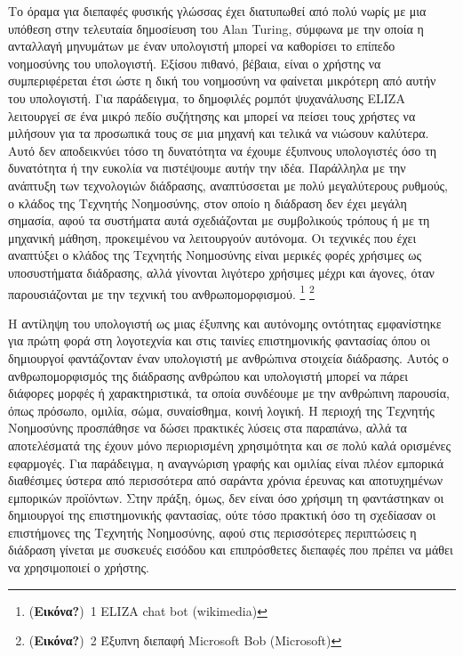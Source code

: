 \documentclass[
]{article}
\begin{document}
Το όραμα για διεπαφές φυσικής γλώσσας έχει διατυπωθεί από πολύ νωρίς με
μια υπόθεση στην τελευταία δημοσίευση του Alan Turing, σύμφωνα με την
οποία η ανταλλαγή μηνυμάτων με έναν υπολογιστή μπορεί να καθορίσει το
επίπεδο νοημοσύνης του υπολογιστή. Εξίσου πιθανό, βέβαια, είναι ο
χρήστης να συμπεριφέρεται έτσι ώστε η δική του νοημοσύνη να φαίνεται
μικρότερη από αυτήν του υπολογιστή. Για παράδειγμα, το δημοφιλές ρομπότ
ψυχανάλυσης ELIZA λειτουργεί σε ένα μικρό πεδίο συζήτησης και μπορεί να
πείσει τους χρήστες να μιλήσουν για τα προσωπικά τους σε μια μηχανή και
τελικά να νιώσουν καλύτερα. Αυτό δεν αποδεικνύει τόσο τη δυνατότητα να
έχουμε έξυπνους υπολογιστές όσο τη δυνατότητα ή την ευκολία να
πιστέψουμε αυτήν την ιδέα. Παράλληλα με την ανάπτυξη των τεχνολογιών
διάδρασης, αναπτύσσεται με πολύ μεγαλύτερους ρυθμούς, ο κλάδος της
Τεχνητής Νοημοσύνης, στον οποίο η διάδραση δεν έχει μεγάλη σημασία, αφού
τα συστήματα αυτά σχεδιάζονται με συμβολικούς τρόπους ή με τη μηχανική
μάθηση, προκειμένου να λειτουργούν αυτόνομα. Οι τεχνικές που έχει
αναπτύξει ο κλάδος της Τεχνητής Νοημοσύνης είναι μερικές φορές χρήσιμες
ως υποσυστήματα διάδρασης, αλλά γίνονται λιγότερο χρήσιμες μέχρι και
άγονες, όταν παρουσιάζονται με την τεχνική του ανθρωπομορφισμού.
\footnote{(\textbf{Εικόνα?})~1 ELIZA chat bot (wikimedia)} \footnote{(\textbf{Εικόνα?})~2
  Έξυπνη διεπαφή Microsoft Bob (Microsoft)}

Η αντίληψη του υπολογιστή ως μιας έξυπνης και αυτόνομης οντότητας
εμφανίστηκε για πρώτη φορά στη λογοτεχνία και στις ταινίες επιστημονικής
φαντασίας όπου οι δημιουργοί φαντάζονταν έναν υπολογιστή με ανθρώπινα
στοιχεία διάδρασης. Αυτός ο ανθρωπομορφισμός της διάδρασης ανθρώπου και
υπολογιστή μπορεί να πάρει διάφορες μορφές ή χαρακτηριστικά, τα οποία
συνδέουμε με την ανθρώπινη παρουσία, όπως πρόσωπο, ομιλία, σώμα,
συναίσθημα, κοινή λογική. Η περιοχή της Τεχνητής Νοημοσύνης προσπάθησε
να δώσει πρακτικές λύσεις στα παραπάνω, αλλά τα αποτελέσματά της έχουν
μόνο περιορισμένη χρησιμότητα και σε πολύ καλά ορισμένες εφαρμογές. Για
παράδειγμα, η αναγνώριση γραφής και ομιλίας είναι πλέον εμπορικά
διαθέσιμες ύστερα από περισσότερα από σαράντα χρόνια έρευνας και
αποτυχημένων εμπορικών προϊόντων. Στην πράξη, όμως, δεν είναι όσο
χρήσιμη τη φαντάστηκαν οι δημιουργοί της επιστημονικής φαντασίας, ούτε
τόσο πρακτική όσο τη σχεδίασαν οι επιστήμονες της Τεχνητής Νοημοσύνης,
αφού στις περισσότερες περιπτώσεις η διάδραση γίνεται με συσκευές
εισόδου και επιπρόσθετες διεπαφές που πρέπει να μάθει να χρησιμοποιεί ο
χρήστης.
\end{document}
